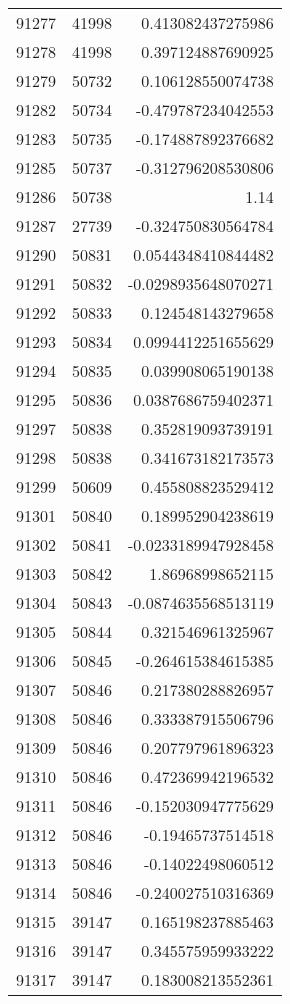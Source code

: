 \begin{tabular}{r | r | r}
91277 & 41998 & 0.413082437275986 \\
91278 & 41998 & 0.397124887690925 \\
91279 & 50732 & 0.106128550074738 \\
91282 & 50734 & -0.479787234042553 \\
91283 & 50735 & -0.174887892376682 \\
91285 & 50737 & -0.312796208530806 \\
91286 & 50738 & 1.14 \\
91287 & 27739 & -0.324750830564784 \\
91290 & 50831 & 0.0544348410844482 \\
91291 & 50832 & -0.0298935648070271 \\
91292 & 50833 & 0.124548143279658 \\
91293 & 50834 & 0.0994412251655629 \\
91294 & 50835 & 0.039908065190138 \\
91295 & 50836 & 0.0387686759402371 \\
91297 & 50838 & 0.352819093739191 \\
91298 & 50838 & 0.341673182173573 \\
91299 & 50609 & 0.455808823529412 \\
91301 & 50840 & 0.189952904238619 \\
91302 & 50841 & -0.0233189947928458 \\
91303 & 50842 & 1.86968998652115 \\
91304 & 50843 & -0.0874635568513119 \\
91305 & 50844 & 0.321546961325967 \\
91306 & 50845 & -0.264615384615385 \\
91307 & 50846 & 0.217380288826957 \\
91308 & 50846 & 0.333387915506796 \\
91309 & 50846 & 0.207797961896323 \\
91310 & 50846 & 0.472369942196532 \\
91311 & 50846 & -0.152030947775629 \\
91312 & 50846 & -0.19465737514518 \\
91313 & 50846 & -0.14022498060512 \\
91314 & 50846 & -0.240027510316369 \\
91315 & 39147 & 0.165198237885463 \\
91316 & 39147 & 0.345575959933222 \\
91317 & 39147 & 0.183008213552361 \\

\end{tabular}
